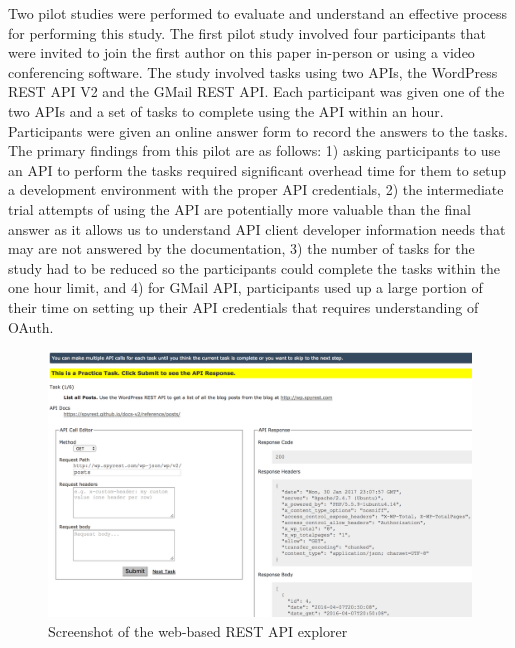 \documentclass[conference]{IEEEtran}
\begin{document}
Two pilot studies were performed to evaluate and understand an effective process for performing this study. The first pilot study involved four participants that were invited to join the first author on this paper in-person or using a video conferencing software. The study involved tasks using two APIs, the WordPress REST API V2 and the GMail REST API. Each participant was given one of the two APIs and a set of tasks to complete using the API within an hour. Participants were given an online answer form to record the answers to the tasks. The primary findings from this pilot are as follows: 1) asking participants to use an API to perform the tasks required significant overhead time for them to setup a development environment with the proper API credentials, 2) the intermediate trial attempts of using the API are potentially more valuable than the final answer as it allows us to understand API client developer information needs that may are not answered by the documentation, 3) the number of tasks for the study had to be reduced so the participants could complete the tasks within the one hour limit, and 4) for GMail API, participants used up a large portion of their time on setting up their API credentials that requires understanding of OAuth.


\begin{figure}[t]
\begin{center}
\includegraphics[width=\linewidth,keepaspectratio]{api_explorer.png}
\end{center}
\caption{Screenshot of the web-based REST API explorer}
\label{fig:api_explorer}
\end{figure}
\end{document}
